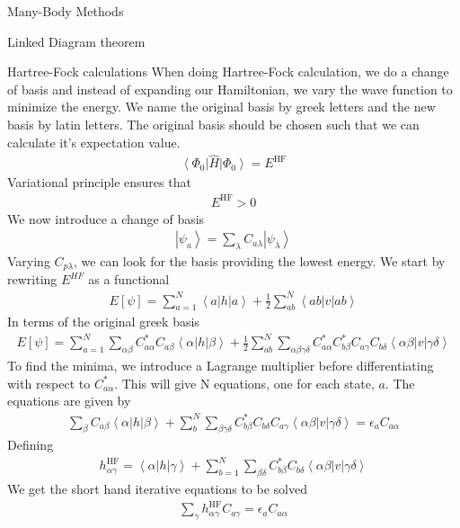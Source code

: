 \documentclass[twoside,english]{uiofysmaster}
\begin{document}
\begin{chapter}{Many-Body Methods}
\begin{section}{Linked Diagram theorem}
	\end{section}

	\begin{section}{Hartree-Fock calculations}
 		When doing Hartree-Fock calculation, we do a change of basis and instead of expanding our Hamiltonian, we vary the wave function to minimize the energy. We name the original basis by greek letters and the new basis by latin letters. The original basis should be chosen such that we can calculate it's expectation value. 
 		\begin{align}
 			\left< \Phi_0 \right| \hat H \left| \Phi_0 \right> = E^{\text{HF}}
 		\end{align}
 		Variational principle ensures that 
 		\begin{align}
 			E^{\text{HF}} > 0 
 		\end{align}
 		We now introduce a change of basis 
 		\begin{align}
 			\left| \psi_a \right> = \sum_{\lambda} C_{a\lambda} \left| \psi_{\lambda} \right>
 		\end{align}
 		Varying $C_{p\lambda}$, we can look for the basis providing the lowest energy. We start by rewriting $E^{HF}$ as a functional
 		\begin{align}
 			E\left[ \psi \right] = \sum_{a=1}^N \left< a \right| h \left| a \right> + \frac{1}{2} \sum_{ab}^N \left< ab \right| v \left| ab \right>
  		\end{align}
  		In terms of the original greek basis
  		\begin{align}
  			E\left[ \psi \right] = \sum_{a=1}^N \sum_{\alpha \beta} C_{a \alpha}^* C_{a \beta} \left< \alpha \right| h \left| \beta \right> + \frac{1}{2} \sum_{ab}^N \sum_{\alpha \beta \gamma \delta} C_{a \alpha}^* C_{b \beta}^* C_{a \gamma} C_{b \delta} \left< \alpha \beta \right| v \left| \gamma \delta \right>
  		\end{align}
  		To find the minima, we introduce a Lagrange multiplier before differentiating with respect to $C_{a  \alpha}^*$. This will give N equations, one for each state, $a$. The equations are given by
  		\begin{align}
  			\sum_{\beta} C_{a \beta} \left< \alpha \right| h \left| \beta \right> + \sum_b^N \sum_{\beta \gamma \delta} C_{b \beta}^* C_{b \delta} C_{a \gamma} \left< \alpha \beta \right| v \left| \gamma \delta \right> = \epsilon_a C_{a \alpha}
  		\end{align}
  		Defining
  		\begin{align}
  			h_{\alpha \gamma}^{\text{HF}} = \left< \alpha \right| h \left| \gamma \right> + \sum_{b=1}^N \sum_{\beta \delta} C_{b \beta}^* C_{b \delta} \left< \alpha \beta \right| v \left| \gamma \delta \right> 
  		\end{align}
  		We get the short hand iterative equations to be solved 
  		\begin{align}
  			\sum_{\gamma} h_{\alpha \gamma}^{\text{HF}} C_{a \gamma} = \epsilon_{a} C_{a \alpha}
  		\end{align}
 	\end{section}

\end{chapter}
\end{document}
